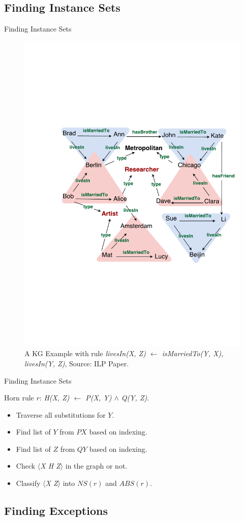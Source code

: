 \documentclass{beamer}
\begin{document}
\subsection{Finding Instance Sets}

\begin{frame}{Finding Instance Sets}

\begin{figure}[h]
	\centering
	\includegraphics[page=1,width=.5\textwidth]{example.pdf}
	\caption{A KG Example with rule \textit{livesIn(X, Z) $\leftarrow$ isMarriedTo(Y, X), livesIn(Y, Z)}, Source: ILP Paper.}
\end{figure}

\end{frame}

\begin{frame}{Finding Instance Sets}

Horn rule $r$: \textit{H(X, Z) $\leftarrow$ P(X, Y) $\wedge$ Q(Y, Z)}.
\begin{itemize}
	\item Traverse all substitutions for $Y$.
	\item Find list of $Y$ from $PX$ based on indexing.
	\item Find list of $Z$ from $QY$ based on indexing.
	\item Check \textit{$\langle$X H Z$\rangle$} in the graph or not.
	\item Classify \textit{$\langle$X Z$\rangle$} into $NS(r)$ and $ABS(r)$.
\end{itemize}

\end{frame}

\subsection{Finding Exceptions}
\end{document}
